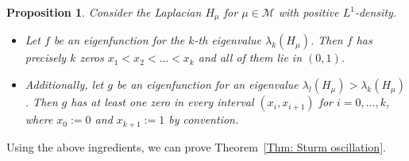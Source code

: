 \documentclass[reqno]{amsart}
\theoremstyle{plain}
\newtheorem{prop}[thm]{Proposition}
\theoremstyle{definition}
\theoremstyle{remark}
\numberwithin{equation}{section}
\newcommand{\cM}{\mathcal{M}}
\begin{document}
\begin{prop} \label{Prop: Sturm comparison for smooth densities}
	Consider the Laplacian $H_\mu$ for $\mu \in \cM$ with positive $L^1$-density.
	
	\begin{itemize}
		\item [(i)] Let $f$ be an eigenfunction for the $k$-th eigenvalue $\lambda_k(H_\mu)$. Then $f$ has precisely $k$ zeros $x_1 < x_2 < \dots < x_k$ and all of them lie in $(0,1)$.
		\item [(ii)] Additionally, let $g$ be an eigenfunction for an eigenvalue $\lambda_l(H_\mu) > \lambda_k(H_\mu)$. Then $g$ has at least one zero in every interval $(x_i, x_{i+1})$ for $i =0, \dots, k$, where $x_0 := 0$ and $x_{k+1} := 1$ by convention.
	\end{itemize}
\end{prop}
Using the above ingredients, we can prove Theorem~\ref{Thm: Sturm oscillation}.
\end{document}
